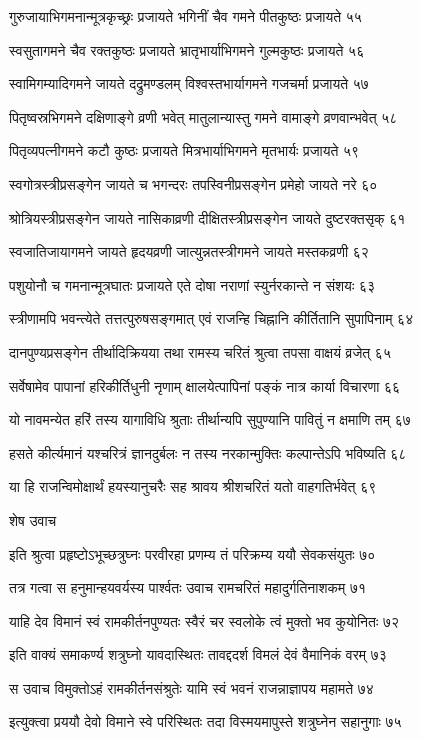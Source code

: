 गुरुजायाभिगमनान्मूत्रकृच्छ्रः प्रजायते
भगिनीं चैव गमने पीतकुष्ठः प्रजायते ५५

स्वसुतागमने चैव रक्तकुष्ठः प्रजायते
भ्रातृभार्याभिगमने गुल्मकुष्ठः प्रजायते ५६

स्वामिगम्यादिगमने जायते दद्रुमण्डलम्
विश्वस्तभार्यागमने गजचर्मा प्रजायते ५७

पितृष्वस्रभिगमने दक्षिणाङ्गे व्रणी भवेत्
मातुलान्यास्तु गमने वामाङ्गे व्रणवान्भवेत् ५८

पितृव्यपत्नीगमने कटौ कुष्ठः प्रजायते
मित्रभार्याभिगमने मृतभार्यः प्रजायते ५९

स्वगोत्रस्त्रीप्रसङ्गेन जायते च भगन्दरः
तपस्विनीप्रसङ्गेन प्रमेहो जायते नरे ६०

श्रोत्रियस्त्रीप्रसङ्गेन जायते नासिकाव्रणी
दीक्षितस्त्रीप्रसङ्गेन जायते दुष्टरक्तसृक् ६१

स्वजातिजायागमने जायते हृदयव्रणी
जात्युन्नतस्त्रीगमने जायते मस्तकव्रणी ६२

पशुयोनौ च गमनान्मूत्रघातः प्रजायते
एते दोषा नराणां स्युर्नरकान्ते न संशयः ६३

स्त्रीणामपि भवन्त्येते तत्तत्पुरुषसङ्गमात्
एवं राजन्हि चिह्नानि कीर्तितानि सुपापिनाम् ६४

दानपुण्यप्रसङ्गेन तीर्थादिक्रियया तथा
रामस्य चरितं श्रुत्वा तपसा वाक्षयं व्रजेत् ६५

सर्वेषामेव पापानां हरिकीर्तिधुनी नृणाम्
क्षालयेत्पापिनां पङ्कं नात्र कार्या विचारणा ६६

यो नावमन्येत हरिं तस्य यागाविधि श्रुताः
तीर्थान्यपि सुपुण्यानि पावितुं न क्षमाणि तम् ६७

हसते कीर्त्यमानं यश्चरित्रं ज्ञानदुर्बलः
न तस्य नरकान्मुक्तिः कल्पान्तेऽपि भविष्यति ६८

या हि राजन्विमोक्षार्थं हयस्यानुचरैः सह
श्रावय श्रीशचरितं यतो वाहगतिर्भवेत् ६९

शेष उवाच

इति श्रुत्वा प्रहृष्टोऽभूच्छत्रुघ्नः परवीरहा
प्रणम्य तं परिक्रम्य ययौ सेवकसंयुतः ७०

तत्र गत्वा स हनुमान्हयवर्यस्य पार्श्वतः
उवाच रामचरितं महादुर्गतिनाशकम् ७१

याहि देव विमानं स्वं रामकीर्तनपुण्यतः
स्वैरं चर स्वलोके त्वं मुक्तो भव कुयोनितः ७२

इति वाक्यं समाकर्ण्य शत्रुघ्नो यावदास्थितः
तावद्ददर्श विमलं देवं वैमानिकं वरम् ७३

स उवाच विमुक्तोऽहं रामकीर्तनसंश्रुतेः
यामि स्वं भवनं राजन्नाज्ञापय महामते ७४

इत्युक्त्वा प्रययौ देवो विमाने स्वे परिस्थितः
तदा विस्मयमापुस्ते शत्रुघ्नेन सहानुगाः ७५

